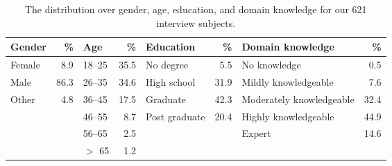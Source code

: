 
\begin{table*}[ht]
	\centering
	\begin{tabular}{l r l r l r l r}
	\toprule
	Gender & \% &
	Age & \% &
	Education & \% &
	Domain knowledge & \% \\
	\midrule
	Female & 8.9  & 18--25   & 35.5 & No degree     & 5.5  & No knowledge             & 0.5  \\
	Male   & 86.3 & 26--35   & 34.6 & High school   & 31.9 & Mildly knowledgeable     & 7.6  \\
	Other  & 4.8  & 36--45   & 17.5 & Graduate      & 42.3 & Moderately knowledgeable & 32.4 \\
	       &      & 46--55   & 8.7  & Post graduate & 20.4 & Highly knowledgeable     & 44.9 \\
	       &      & 56--65   & 2.5  &               &      & Expert                   & 14.6 \\
	       &      & $>$ 65   & 1.2  &               &      & & \\
	\bottomrule
	\end{tabular}
	\caption{The distribution over gender, age, education, and domain knowledge 
	for our 621 interview subjects.}
	\label{tab:survey-demo}
\end{table*}

